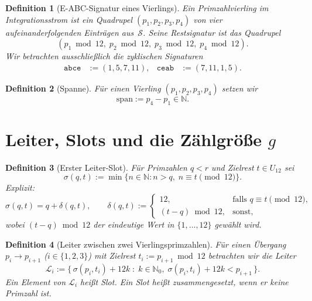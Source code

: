 \documentclass[11pt,a4paper]{article}
\newtheorem{definition}{Definition}
\newcommand{\N}{\mathbb{N}}
\begin{document}
\begin{definition}[E-ABC-Signatur eines Vierlings]
Ein \emph{Primzahlvierling im Integrationsstrom} ist ein Quadrupel
$(p_1,p_2,p_3,p_4)$ von vier aufeinanderfolgenden Einträgen aus~$\mathcal{S}$.
Seine \emph{Restsignatur} ist das Quadrupel
\[
  (p_1\bmod 12,\; p_2\bmod 12,\; p_3\bmod 12,\; p_4\bmod 12).
\]
Wir betrachten ausschließlich die zyklischen Signaturen
\begin{align*}
  \texttt{abce} &:= (1,5,7,11), &
  \texttt{ceab} &:= (7,11,1,5).
\end{align*}
\end{definition}

\begin{definition}[Spanne]
Für einen Vierling $(p_1,p_2,p_3,p_4)$ setzen wir
\[
  \mathrm{span} := p_4 - p_1 \in \N.
\]
\end{definition}

\section{Leiter, Slots und die Zählgröße $g$}

\begin{definition}[Erster Leiter-Slot]
Für Primzahlen $q < r$ und Zielrest $t \in U_{12}$ sei
\[
  \sigma(q,t)
  := \min\{ n \in \N : n > q,\; n \equiv t \pmod{12} \}.
\]
Explizit:
\[
  \sigma(q,t) = q + \delta(q,t),
  \qquad
  \delta(q,t) :=
  \begin{cases}
    12, & \text{falls } q \equiv t \pmod{12},\\[2pt]
    (t - q) \bmod 12, & \text{sonst},
  \end{cases}
\]
wobei $(t-q)\bmod 12$ der eindeutige Wert in $\{1,\ldots,12\}$ gewählt wird.
\end{definition}

\begin{definition}[Leiter zwischen zwei Vierlingsprimzahlen]
Für einen Übergang $p_i \to p_{i+1}$ ($i \in \{1,2,3\}$) mit Zielrest
$t_i := p_{i+1} \bmod 12$ betrachten wir die \emph{Leiter}
\[
  \mathcal{L}_i := \{\, \sigma(p_i,t_i) + 12k \;:\; k \in \N_0,\;
  \sigma(p_i,t_i) + 12k < p_{i+1} \,\}.
\]
Ein Element von $\mathcal{L}_i$ heißt \emph{Slot}.
Ein Slot heißt \emph{zusammengesetzt}, wenn er keine Primzahl ist.
\end{definition}
\end{document}
